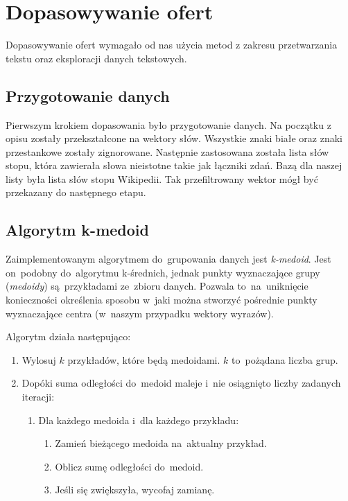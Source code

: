 \documentclass[a4paper,12pt]{mwart}
\begin{document}
\section{Dopasowywanie ofert}
Dopasowywanie ofert wymagało od nas użycia metod z zakresu przetwarzania tekstu oraz eksploracji danych tekstowych.

\subsection{Przygotowanie danych}
Pierwszym krokiem dopasowania było przygotowanie danych. Na początku z opisu
zostały przekształcone na wektory słów. Wszystkie znaki białe oraz znaki
przestankowe zostały zignorowane. Następnie zastosowana została lista słów stopu,
która zawierała słowa nieistotne takie jak łączniki zdań. Bazą dla naszej listy
była lista słów stopu Wikipedii. Tak przefiltrowany wektor mógł być przekazany
do następnego etapu.

\subsection{Algorytm k-medoid}

Zaimplementowanym algorytmem do~grupowania danych jest \emph{k-medoid}. Jest
on~podobny do~algorytmu k-średnich, jednak punkty wyznaczające grupy
(\emph{medoidy}) są~przykładami ze~zbioru danych. Pozwala to~na~uniknięcie
konieczności określenia sposobu w~jaki można stworzyć pośrednie punkty
wyznaczające centra (w~naszym przypadku wektory wyrazów).

Algorytm działa następująco:

\begin{enumerate}
\item Wylosuj $k$ przykładów, które będą medoidami. $k$ to~pożądana liczba
  grup.
\item Dopóki suma odległości do~medoid maleje i~nie osiągnięto liczby
  zadanych iteracji:
\begin{enumerate}[label*=\arabic*.]
\item Dla każdego medoida i~dla każdego przykładu:
\begin{enumerate}[label*=\arabic*.]
\item Zamień bieżącego medoida na~aktualny przykład.
\item Oblicz sumę odległości do~medoid.
\item Jeśli się zwiększyła, wycofaj zamianę.
\end{enumerate}
\end{enumerate}
\end{enumerate}
\end{document}
